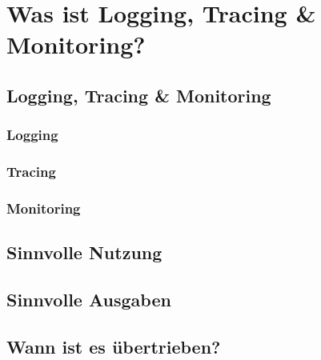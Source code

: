 \chapter{Was ist Logging, Tracing {\selectfont \&} Monitoring?}\label{ch:was-ist-logging-tracing-&-monitoring?}


\section{Logging, Tracing {\selectfont \&} Monitoring}\label{sec:logging-tracing-&-monitoring}

\subsection{Logging}\label{subsec:logging}

\subsection{Tracing}\label{subsec:tracing}

\subsection{Monitoring}\label{subsec:monitoring}


\section{Sinnvolle Nutzung}\label{sec:sinnvolle-nutzung}


\section{Sinnvolle Ausgaben}\label{sec:sinnvolle-ausgaben}


\section{Wann ist es übertrieben?}\label{sec:wann-ist-es-übertrieben?}

